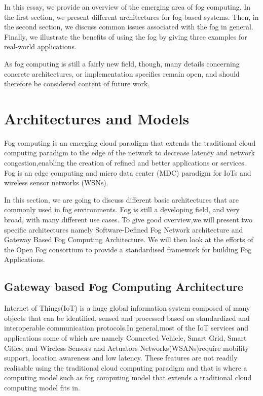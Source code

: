\documentclass{article}
\begin{document}
In this essay, we provide an overview of the emerging area of fog computing. In the first section, we present different architectures for fog-based systems. Then, in the second section, we discuss common issues associated with the fog in general. Finally, we illustrate the benefits of using the fog by giving three examples for real-world applications.

As fog computing is still a fairly new field, though, many details concerning concrete architectures, or implementation specifics remain open, and should therefore be considered content of future work.


\section{Architectures and Models}
Fog computing is an emerging cloud paradigm that extends the traditional cloud computing paradigm to the edge of the network to decrease latency and network congestion,enabling the creation of refined and better applications or services. Fog is an edge computing and micro data center (MDC) paradigm for IoTs and wireless sensor networks (WSNs).

In this section, we are going to discuss different basic architectures that are commonly used in fog environments. Fog is still a developing field, and very broad, with many different use cases. To give good overview,we will present two specific architectures namely Software-Defined Fog Network architecture and Gateway Based Fog Computing Architecture.
We will then look at the efforts of the Open Fog consortium to provide a standardised framework for building Fog Applications.

\subsection{Gateway based Fog Computing Architecture}

Internet of Things(IoT) is a huge global information system composed of many objects that can be identified, sensed and processed based on standardized and interoperable
communication protocols\cite{lee2016gateway}.In general,most of the IoT services and applications some of which are namely Connected Vehicle, Smart Grid, Smart Cities, and Wireless Sensors and Actuators Networks(WSANs)require mobility support, location
awareness and low latency\cite{lee2016gateway}. These features are not readily realisable using the traditional cloud computing paradigm and that is where a computing model such as fog computing model that extends a traditional cloud computing model fits in.
\end{document}
